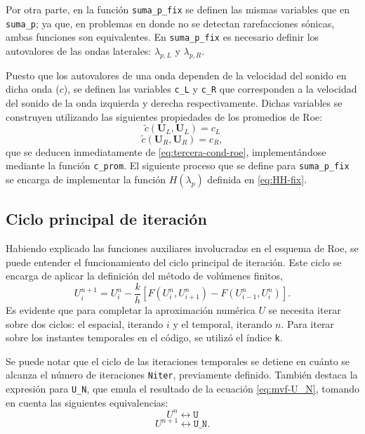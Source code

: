 Por otra parte, en la función \texttt{suma\_p\_fix} se definen las mismas variables que en \texttt{suma\_p}; ya que, en problemas en donde no se detectan rarefacciones sónicas, ambas funciones son equivalentes. En \texttt{suma\_p\_fix} es necesario definir los autovalores de las ondas laterales: $\lambda_{p,L}$ y $\lambda_{p,R}$.

Puesto que los autovalores de una onda dependen de la velocidad del sonido en dicha onda ($c$), se definen las variables \texttt{c\_L} y \texttt{c\_R} que corresponden a la velocidad del sonido de la onda izquierda y derecha respectivamente. Dichas variables se construyen utilizando las siguientes propiedades de los promedios de Roe:
\begin{equation}
	\tilde{c}(\mathbf{{U}}_L, \mathbf{{U}}_L) = c_L
\end{equation}
\begin{equation}
	\tilde{c}(\mathbf{{U}}_R, \mathbf{{U}}_R) = c_R,
\end{equation}
que se deducen inmediatamente de \ref{eq:tercera-cond-roe}, implementándose mediante la función \texttt{c\_prom}. El siguiente proceso que se define para \texttt{suma\_p\_fix} se encarga de implementar la función $H(\lambda_{p})$ definida en \eqref{eq:HH-fix}.


\subsection{Ciclo principal de iteración}
Habiendo explicado las funciones auxiliares involucradas en el esquema de Roe, se puede entender el funcionamiento del ciclo principal de iteración. Este ciclo se encarga de aplicar la definición del método de volúmenes finitos,
\begin{equation}
	U_{i}^{n+1} = U_{i}^{n} -
	\frac{k}{h}\left[ F(U_{i}^n, U_{i+1}^n) - F(U_{i-1}^n, U_i^n)\right].
	\label{eq:mvf-U_N}
\end{equation}
Es evidente que para completar la aproximación numérica $U$ se necesita iterar sobre dos ciclos: el espacial, iterando $i$ y el temporal, iterando $n$. Para iterar sobre los instantes temporales en el código, se utilizó el índice \texttt{k}.

Se puede notar que el ciclo de las iteraciones temporales se detiene en cuánto se alcanza el número de iteraciones \texttt{Niter}, previamente definido. También destaca la expresión para \texttt{U\_N}, que emula el resultado de la ecuación \eqref{eq:mvf-U_N}, tomando en cuenta las siguientes equivalencias:
\begin{equation}
	U^{n} \leftrightarrow \texttt{U}
\end{equation}
\begin{equation}
	U^{n+1} \leftrightarrow \texttt{U\_N}.
\end{equation}

